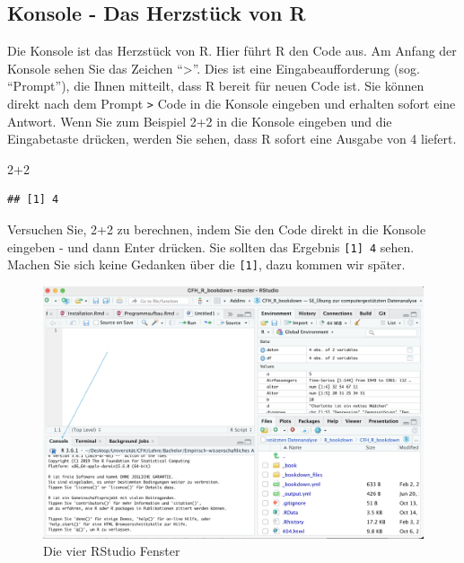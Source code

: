 \documentclass[
]{book}
\newenvironment{Shaded}{\begin{snugshade}}{\end{snugshade}}
\newcommand{\DecValTok}[1]{\textcolor[rgb]{0.00,0.00,0.81}{#1}}
\newcommand{\SpecialCharTok}[1]{\textcolor[rgb]{0.00,0.00,0.00}{#1}}
\begin{document}
\hypertarget{konsole---das-herzstuxfcck-von-r}{%
\subsection{Konsole - Das Herzstück von R}\label{konsole---das-herzstuxfcck-von-r}}

Die Konsole ist das Herzstück von R. Hier führt R den Code aus. Am Anfang der Konsole sehen Sie das Zeichen ``\textgreater{}''. Dies ist eine Eingabeaufforderung (sog. ``Prompt''), die Ihnen mitteilt, dass R bereit für neuen Code ist. Sie können direkt nach dem Prompt \texttt{\textgreater{}} Code in die Konsole eingeben und erhalten sofort eine Antwort. Wenn Sie zum Beispiel 2+2 in die Konsole eingeben und die Eingabetaste drücken, werden Sie sehen, dass R sofort eine Ausgabe von 4 liefert.

\begin{Shaded}
\begin{Highlighting}[]
\DecValTok{2}\SpecialCharTok{+}\DecValTok{2}
\end{Highlighting}
\end{Shaded}

\begin{verbatim}
## [1] 4
\end{verbatim}

Versuchen Sie, 2+2 zu berechnen, indem Sie den Code direkt in die Konsole eingeben - und dann Enter drücken.
Sie sollten das Ergebnis \texttt{{[}1{]}\ 4} sehen. Machen Sie sich keine Gedanken über die \texttt{{[}1{]}}, dazu kommen wir später.

\begin{figure}
\includegraphics[width=28.08in]{images/windows_console} \caption{Die vier RStudio Fenster}\label{fig:unnamed-chunk-4}
\end{figure}
\end{document}
